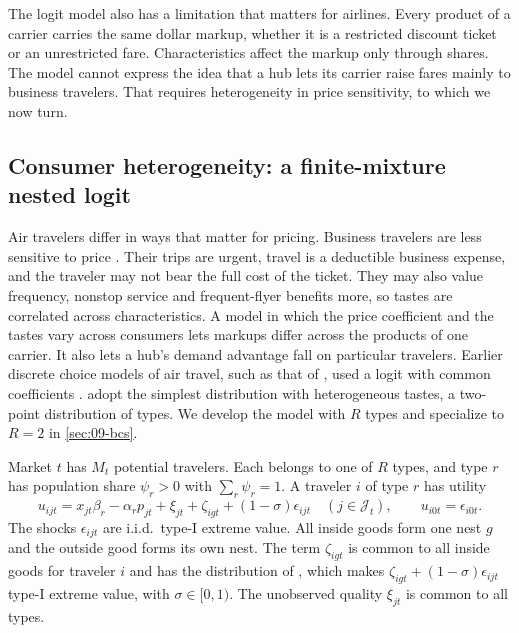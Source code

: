 The logit model also has a limitation that matters for airlines. Every product of a carrier carries the
same dollar markup, whether it is a restricted discount ticket or an unrestricted fare. Characteristics
affect the markup only through shares. The model cannot express the idea that a hub lets its carrier
raise fares mainly to business travelers. That requires heterogeneity in price sensitivity, to which we
now turn.

\subsection{Consumer heterogeneity: a finite-mixture nested logit}\label{sec:09-pricing-types}

Air travelers differ in ways that matter for pricing. Business travelers are less sensitive to price
\citep[p.~10, n.~9]{BerryCarnallSpiller2006}. Their trips are urgent, travel is a deductible business
expense, and the traveler may not bear the full cost of the ticket. They may also value frequency, nonstop service and
frequent-flyer benefits more, so tastes are correlated across characteristics. A model in which the
price coefficient and the tastes vary across consumers lets markups differ across the products of one
carrier. It also lets a hub's demand advantage fall on particular travelers.
Earlier discrete choice models of air travel, such as that of \citet{MorrisonWinston1986}, used a
logit with common coefficients \citep[p.~8]{BerryCarnallSpiller2006}. \citet{BerryCarnallSpiller2006}
adopt the simplest distribution with heterogeneous tastes, a two-point distribution of types. We develop the model with $R$ types and specialize to $R=2$ in \cref{sec:09-bcs}.

\begin{assumption}\label{ass:09-fm}
Market $t$ has $M_t$ potential travelers. Each belongs to one of $R$ types, and type $r$ has population
share $\psi_r>0$ with $\sum_r\psi_r=1$. A traveler $i$ of type $r$ has utility
\begin{equation*}
u_{ijt}=x_{jt}\beta_r-\alpha_rp_{jt}+\xi_{jt}+\zeta_{igt}+(1-\sigma)\epsilon_{ijt}
\quad (j\in\mathcal{J}_t),\qquad u_{i0t}=\epsilon_{i0t}.
\end{equation*}
The shocks $\epsilon_{ijt}$ are i.i.d.\ type-I extreme value. All inside goods form one nest $g$ and the
outside good forms its own nest. The term $\zeta_{igt}$ is common to all inside goods for traveler $i$
and has the distribution of \citet{Cardell1997}, which makes $\zeta_{igt}+(1-\sigma)\epsilon_{ijt}$
type-I extreme value, with $\sigma\in[0,1)$. The unobserved quality $\xi_{jt}$ is common to all types.
\end{assumption}

